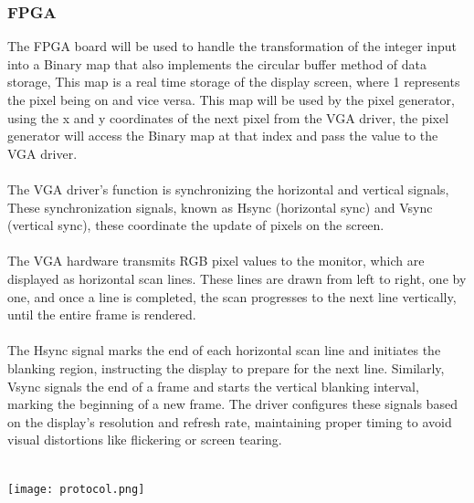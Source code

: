 \documentclass{article}
\begin{document}
\subsubsection{FPGA}
The FPGA board will be used to handle the transformation of the integer input into a Binary map that also implements the circular buffer method of data storage, This map is a real time storage of the display screen, where 1 represents the pixel being on and vice versa. This map will be used by the pixel generator, using the x and y coordinates of the next pixel from the VGA driver, the pixel generator will access the Binary map at that index and pass the value to the VGA driver. \\\\
The VGA driver’s function is synchronizing the horizontal and vertical signals, These synchronization signals, known as Hsync (horizontal sync) and Vsync (vertical sync), these coordinate the update of pixels on the screen.\\\\
The VGA hardware transmits RGB pixel values to the monitor, which are displayed as horizontal scan lines. These lines are drawn from left to right, one by one, and once a line is completed, the scan progresses to the next line vertically, until the entire frame is rendered.\\\\
The Hsync signal marks the end of each horizontal scan line and initiates the blanking region, instructing the display to prepare for the next line. Similarly, Vsync signals the end of a frame and starts the vertical blanking interval, marking the beginning of a new frame. The driver configures these signals based on the display’s resolution and refresh rate, maintaining proper timing to avoid visual distortions like flickering or screen tearing.\\\\

    \begin{center}
        \texttt{[image: protocol.png]}
    \end{center}
\end{document}
